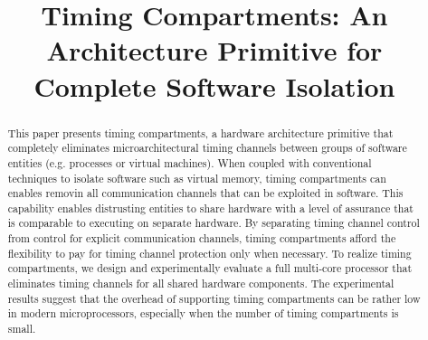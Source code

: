 \title{
\vspace{-0.1in}
    Timing Compartments: An Architecture Primitive for Complete Software 
    Isolation
}



\date{}
\maketitle

\thispagestyle{empty}

\begin{abstract}
    This paper presents timing compartments, a hardware architecture primitive 
    that completely eliminates microarchitectural timing channels between 
    groups of software entities (e.g. processes or virtual machines). 
    When coupled with conventional techniques to isolate software such as
    virtual memory, timing compartments can enables removin all communication channels
    that can be exploited in software.
    This capability enables distrusting entities to share hardware with
    a level of assurance that is comparable to executing on 
    separate hardware.
    By separating timing channel control from control for explicit communication
    channels, timing compartments afford the flexibility to pay for timing 
    channel protection only when necessary. To realize timing compartments, we 
    design and experimentally evaluate a full multi-core processor that eliminates 
    timing channels for all shared hardware components.
    The experimental results suggest that the overhead of supporting 
    timing compartments can be rather low in modern microprocessors, especially when
    the number of timing compartments is small.

\end{abstract}
